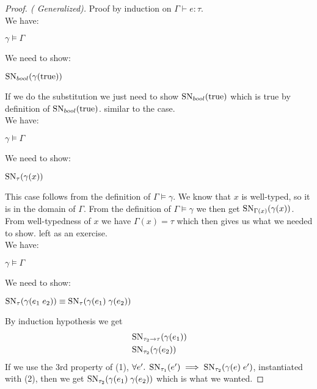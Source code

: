 \begin{proof}[Proof. ( Generalized)] Proof by induction on $\Gamma \vdash e : \tau$.
 \\
We have: 
\begin{description}
  \item $\gamma \models \Gamma$
\end{description}
We need to show:
\begin{description}
  \item $\operatorname{SN}_{bool}(\gamma(\text{true}))$
\end{description}
If we do the substitution we just need to show $\operatorname{SN}_{bool}(\text{true})$ which is true by definition of $\operatorname{SN}_{bool}(\text{true})$.
 similar to the \true{} case.
\case{\TVar}\\
We have: 
\begin{description}
  \item $\gamma \models \Gamma$
\end{description}
We need to show:
\begin{description}
  \item $\operatorname{SN}_{\tau}(\gamma(x))$
\end{description}
This case follows from the definition of $\Gamma \models \gamma$. We know that $x$ is well-typed, so it is in the domain of $\Gamma$. From the definition of $\Gamma \models \gamma$ we then get $\operatorname{SN}_{\Gamma(x)}(\gamma(x))$. From well-typedness of $x$ we have $\Gamma(x) = \tau$ which then gives us what we needed to show.
 left as an exercise.
\case{\TApp}\\
We have: 
\begin{description}
  \item $\gamma \models \Gamma$
\end{description}
We need to show:
\begin{description}
  \item $\operatorname{SN}_{\tau}(\gamma(e_1 \; e_2)) \equiv \operatorname{SN}_{\tau}(\gamma(e_1) \; \gamma(e_2))$
\end{description}
By induction hypothesis we get
\begin{align}
  &\operatorname{SN}_{ \tau_2 \rightarrow \tau}(\gamma(e_1)) \\
  &\operatorname{SN}_{\tau_2}(\gamma(e_2))
\end{align}
If we use the 3rd property of (1), $\forall e'. \; \operatorname{SN}_{\tau_1}(e') \implies \operatorname{SN}_{\tau_2}(\gamma(e) \; e')$, instantiated with (2), then we get $\operatorname{SN}_{\tau_2}(\gamma(e_1) \; \gamma(e_2))$ which is what we wanted.

\end{proof}
